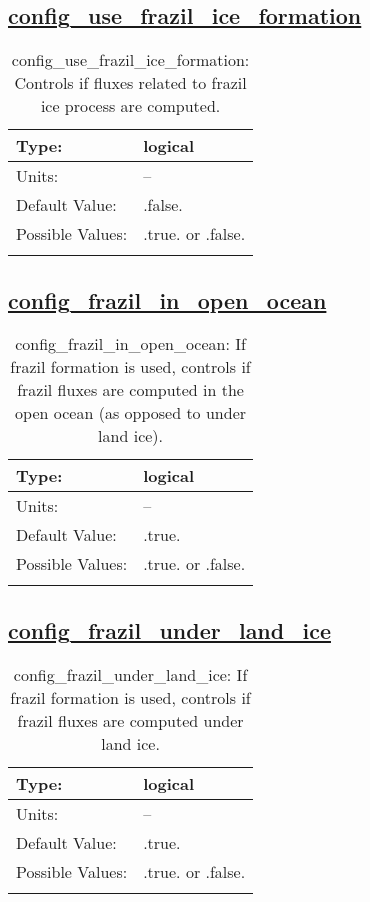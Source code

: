 \subsection[config\_use\_frazil\_ice\_formation]{\hyperref[sec:nm_tab_frazil_ice]{config\_use\_frazil\_ice\_formation}}
\label{subsec:nm_sec_config_use_frazil_ice_formation}
\begin{center}
\begin{longtable}{| p{2.0in} || p{4.0in} |}
    \hline
    Type: & logical \\
    \hline
    Units: & -- \\
    \hline
    Default Value: & .false. \\
    \hline
    Possible Values: & .true. or .false. \\
    \hline
    \caption{config\_use\_frazil\_ice\_formation: Controls if fluxes related to frazil ice process are computed.}
\end{longtable}
\end{center}
\subsection[config\_frazil\_in\_open\_ocean]{\hyperref[sec:nm_tab_frazil_ice]{config\_frazil\_in\_open\_ocean}}
\label{subsec:nm_sec_config_frazil_in_open_ocean}
\begin{center}
\begin{longtable}{| p{2.0in} || p{4.0in} |}
    \hline
    Type: & logical \\
    \hline
    Units: & -- \\
    \hline
    Default Value: & .true. \\
    \hline
    Possible Values: & .true. or .false. \\
    \hline
    \caption{config\_frazil\_in\_open\_ocean: If frazil formation is used, controls if frazil fluxes are computed in the open ocean (as opposed to under land ice).}
\end{longtable}
\end{center}
\subsection[config\_frazil\_under\_land\_ice]{\hyperref[sec:nm_tab_frazil_ice]{config\_frazil\_under\_land\_ice}}
\label{subsec:nm_sec_config_frazil_under_land_ice}
\begin{center}
\begin{longtable}{| p{2.0in} || p{4.0in} |}
    \hline
    Type: & logical \\
    \hline
    Units: & -- \\
    \hline
    Default Value: & .true. \\
    \hline
    Possible Values: & .true. or .false. \\
    \hline
    \caption{config\_frazil\_under\_land\_ice: If frazil formation is used, controls if frazil fluxes are computed under land ice.}
\end{longtable}
\end{center}
